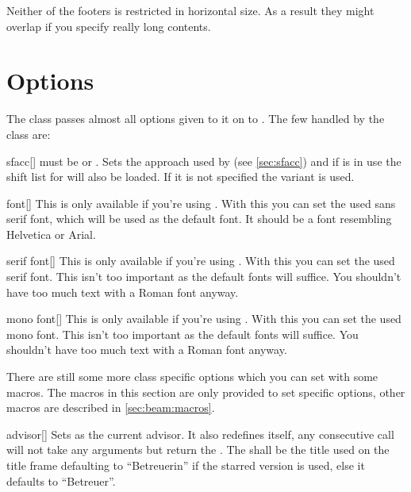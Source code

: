 Neither of the footers is restricted in horizontal size. As a result they might
overlap if you specify really long contents.

\section{Options}
The class passes almost all options given to it on to . The few
handled by the class are:

\begin{describeopt}{sfacc}[]
   must be  or . Sets the approach used by
   (see \autoref{sec:sfacc}) and if  is in use the shift
  list for  will also be loaded. If it is not specified the
   variant is used.
\end{describeopt}
\begin{describeopt}{font}[]
  This is only available if you're using \luaxetex. With this you can set the
  used sans serif font, which will be used as the default font. It should be
  a font resembling Helvetica or Arial.
\end{describeopt}
\begin{describeopt}{serif font}[]
  This is only available if you're using \luaxetex. With this you can set the
  used serif font. This isn't too important as the default fonts will suffice.
  You shouldn't have too much text with a Roman font anyway.
\end{describeopt}
\begin{describeopt}{mono font}[]
  This is only available if you're using \luaxetex. With this you can set the
  used mono font. This isn't too important as the default fonts will suffice.
  You shouldn't have too much text with a Roman font anyway.
\end{describeopt}

There are still some more class specific options which you can set with some
macros. The macros in this section are only provided to set specific options,
other macros are described in \autoref{sec:beam:macros}.

\begin{describemacro}{advisor}[\meta{*}]
  Sets  as the current advisor. It also redefines itself, any
  consecutive call will not take any arguments but return the . The
   shall be the title used on the title frame defaulting to
  \enquote{Betreuerin} if the starred version is used, else it defaults to
  \enquote{Betreuer}.
\end{describemacro}

